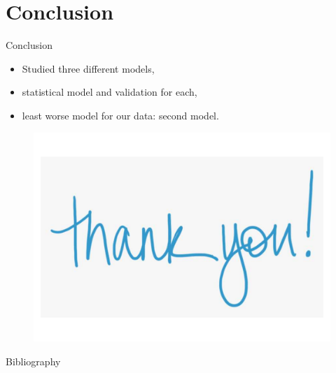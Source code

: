 \documentclass[unknownkeysallowed]{beamer}
\begin{document}
\section{Conclusion}

\begin{frame}{Conclusion}
\begin{itemize}
    \item Studied three different models,
    \item statistical model and validation for each, 
    \item least worse model for our data: second model.
\end{itemize}
\begin{figure}[H]
    \centering
    \includegraphics[scale=.2]{./images/thanks.pdf}
    \end{figure}
\end{frame}



\begin{frame}{Bibliography}
\nocite{*}
\printbibliography
\end{frame}
\end{document}
